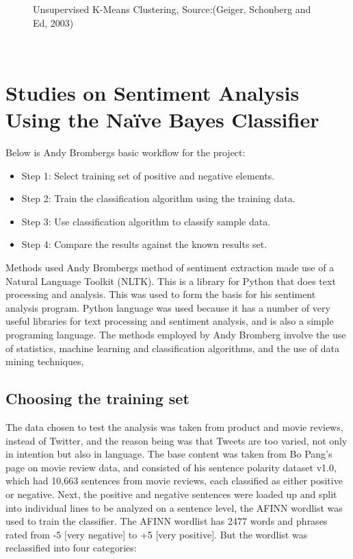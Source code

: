 \begin{figure}[h]
  \centering
  \caption[Vector graphics example]%
  {Unsupervised K-Means Clustering, Source:(Geiger, Schonberg and Ed, 2003)}
  \label{fig:ALAP:sm3}
\end{figure}

\leavevmode\\
\section{Studies on Sentiment Analysis Using the Naïve Bayes Classifier}
Below is Andy Bromberg\textquotesingle s basic workflow for the project:
\begin{itemize}
\item Step 1: Select training set of positive and negative elements.
\item Step 2: Train the classification algorithm using the training data.
\item Step 3: Use classification algorithm to classify sample data.
\item Step 4: Compare the results against the known results set.
\end{itemize}
Methods used
Andy Bromberg\textquotesingle s method of sentiment extraction made use of a Natural Language Toolkit
(NLTK). This is a library for Python that does text processing and analysis. This was used to form
the basis for his sentiment analysis program. Python language was used because it has a number
of very useful libraries for text processing and sentiment analysis, and is also a simple programing
language. The methods employed by Andy Bromberg involve the use of statistics, machine
learning and classification algorithms, and the use of data mining techniques, \cite{ref31}

\subsection{Choosing the training set}
The data chosen to test the analysis was taken from product and movie reviews, instead of Twitter,
and the reason being was that Tweets are too varied, not only in intention but also in language.
The base content was taken from Bo Pang’s page on movie review data, and consisted of his
sentence polarity dataset v1.0, which had 10,663 sentences from movie reviews, each classified as
either positive or negative. Next, the positive and negative sentences were loaded up and split into
individual lines to be analyzed on a sentence level, the AFINN wordlist was used to train the
classifier. The AFINN wordlist has 2477 words and phrases rated from -5 [very negative] to +5
[very positive]. But the wordlist was reclassified into four categories:


